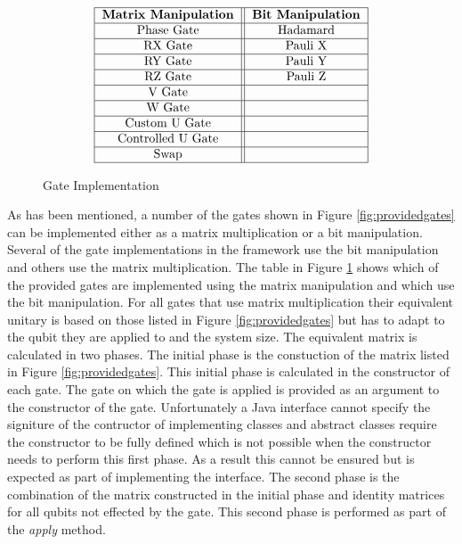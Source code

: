 \begin{figure}
\[
\begin{tabular}{ | c || c | }
\hline
\textbf{Matrix Manipulation} & \textbf{Bit Manipulation} \\ \hline
Phase Gate & Hadamard \\ \hline
RX Gate & Pauli X \\ \hline
RY Gate & Pauli Y \\ \hline
RZ Gate & Pauli Z \\ \hline
V Gate & \\ \hline
W Gate & \\ \hline
Custom U Gate & \\ \hline
Controlled U Gate & \\ \hline
Swap & \\ \hline
\end{tabular}
\]
\caption{Gate Implementation}
\label{fig:gateimps}
\end{figure}

As has been mentioned, a number of the gates shown in Figure \ref{fig:providedgates} can be implemented either as a matrix multiplication or a bit manipulation.
Several of the gate implementations in the framework use the bit manipulation and others use the matrix multiplication.
The table in Figure \ref{fig:gateimps} shows which of the provided gates are implemented using the matrix manipulation and which use the bit manipulation.
For all gates that use matrix multiplication their equivalent unitary is based on those listed in Figure \ref{fig:providedgates} but has to adapt to the qubit they are applied to and the system size.
The equivalent matrix is calculated in two phases.
The initial phase is the constuction of the matrix listed in Figure \ref{fig:providedgates}.
This initial phase is calculated in the constructor of each gate.
The gate on which the gate is applied is provided as an argument to the constructor of the gate.
Unfortunately a Java interface cannot specify the signiture of the contructor of implementing classes and abstract classes require the constructor to be fully defined which is not possible when the constructor needs to perform this first phase.
As a result this cannot be ensured but is expected as part of implementing the interface.
The second phase is the combination of the matrix constructed in the initial phase and identity matrices for all qubits not effected by the gate.
This second phase is performed as part of the \emph{apply} method.

